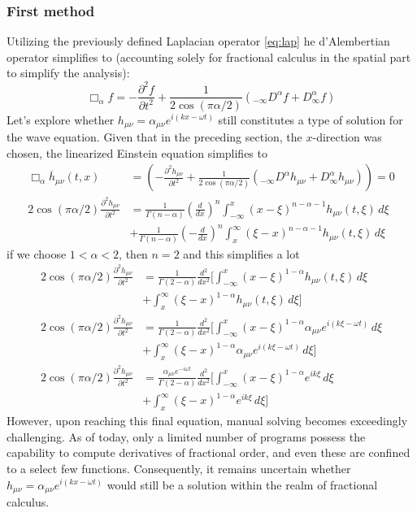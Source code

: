 \documentclass[a4paper,12pt]{extarticle}
\newcommand{\mn}{{\mu\nu}}
\numberwithin{equation}{subsection}
\begin{document}
\subsubsection{First method}
Utilizing the previously defined Laplacian operator \eqref{eq:lap} he d'Alembertian operator simplifies to (accounting solely for fractional calculus in the spatial part to simplify the analysis):
\begin{equation}
\Box_\alpha f=-\frac{\partial^2f}{\partial t^2}+\frac{1}{2\cos(\pi\alpha/2)}\left(_{-\infty}D^\alpha f+D_\infty^\alpha f\right)
\end{equation}
Let's explore whether $h_\mn=\alpha_\mn e^{i(kx-\omega t)}$ still constitutes a type of solution for the wave equation. Given that in the preceding section, the $x$-direction was chosen, the linearized Einstein equation simplifies to
\begin{equation*}
\begin{aligned}
\Box_\alpha \overline h_\mn(t,x)&=\left(-\frac{\partial^2 h_\mn}{\partial t^2}+\frac{1}{2\cos(\pi\alpha/2)}\left(_{-\infty}D^\alpha h_\mn+D_\infty^\alpha h_\mn\right)\right)=0\\
2\cos(\pi\alpha/2)\frac{\partial^2 h_\mn}{\partial t^2}&=\frac{1}{\Gamma(n-\alpha)}\left(\frac{d}{dx}\right)^n\int_{-\infty}^x(x-\xi)^{n-\alpha-1}h_\mn(t,\xi)\,d\xi\\
&+\frac{1}{\Gamma(n-\alpha)}\left(-\frac{d}{dx}\right)^n\int_x^\infty(\xi-x)^{n-\alpha-1}h_\mn(t,\xi)\,d\xi
\end{aligned}
\end{equation*}
if we choose $1<\alpha<2$, then $n=2$ and this simplifies a lot
\begin{align*}
2\cos(\pi\alpha/2)\frac{\partial^2 h_\mn}{\partial t^2}&=\frac{1}{\Gamma(2-\alpha)}\frac{d^2}{dx^2}\Biggl[\int_{-\infty}^x(x-\xi)^{1-\alpha}h_\mn(t,\xi)\,d\xi\\
&+\int_x^\infty(\xi-x)^{1-\alpha}h_\mn(t,\xi)\,d\xi\Biggr]\\
2\cos(\pi\alpha/2)\frac{\partial^2 h_\mn}{\partial t^2}&=\frac{1}{\Gamma(2-\alpha)}\frac{d^2}{dx^2}\Biggl[\int_{-\infty}^x(x-\xi)^{1-\alpha}\alpha_\mn e^{i(k\xi-\omega t)}\,d\xi\\
&+\int_x^\infty(\xi-x)^{1-\alpha}\alpha_\mn e^{i(k\xi-\omega t)}\,d\xi\Biggr]\\
2\cos(\pi\alpha/2)\frac{\partial^2 h_\mn}{\partial t^2}&=\frac{\alpha_\mn e^{-i\omega t}}{\Gamma(2-\alpha)}\frac{d^2}{dx^2}\Biggl[\int_{-\infty}^x(x-\xi)^{1-\alpha}e^{ik\xi}\,d\xi\\
&+\int_x^\infty(\xi-x)^{1-\alpha}e^{ik\xi}\,d\xi\Biggr]
\end{align*}
However, upon reaching this final equation, manual solving becomes exceedingly challenging. As of today, only a limited number of programs possess the capability to compute derivatives of fractional order, and even these are confined to a select few functions. Consequently, it remains uncertain whether $h_\mn=\alpha_\mn e^{i(kx-\omega t)}$ would still be a solution within the realm of fractional calculus.
\end{document}
